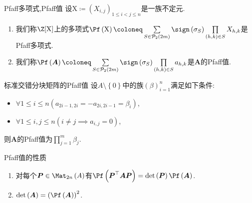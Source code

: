 \begin{definition}{Pfaff多项式,Pfaff值}{}
	设$\mathrm{X}\coloneq\left(X_{i,j}\right)_{1\leq i<j\leq n}$是一族不定元.
	\begin{enumerate}
		\item 我们称$\Z[\mathrm{X}]$上的多项式$\Pf\left(\mathrm{X}\right)\coloneq\sum\limits_{S\in\mathcal{P}_{2}\left(2m\right)}\sign\left(\sigma_{S}\right)\prod\limits_{\left(h,k\right)\in S}X_{h,k}$是Pfaff多项式.
		\item 我们称$\Pf\left(\boldsymbol{A}\right)\coloneq\sum\limits_{S\in\mathcal{P}_{2}\left(2m\right)}\sign\left(\sigma_{S}\right)\prod\limits_{\left(h,k\right)\in S}a_{h,k}$是$\boldsymbol{A}$的Pfaff值.
	\end{enumerate}
\end{definition}

\begin{example}{标准交错分块矩阵的Pfaff值}{}
	设$A\setminus\left\{0\right\}$中的族$\left(\beta\right)_{i=1}^{n}$满足如下条件:
	\begin{itemize}
		\item $\forall 1\leq i\leq n\left(a_{2i-1,2i}=-a_{2i,2i-1}=\beta_{i}\right)$,
		\item $\forall 1\leq i,j\leq n\left(i\neq j\implies a_{i,j}=0\right)$,
	\end{itemize}
	则$\boldsymbol{A}$的Pfaff值为$\prod\limits_{j=1}^{m}\beta_{j}$.
\end{example}

\begin{proposition}{Pfaff值的性质}{}
	\begin{enumerate}
		\item 对每个$\boldsymbol{P}\in\Mat_{2n}\left(A\right)$有$\Pf\left(\boldsymbol{P}^{\top}\boldsymbol{A}\boldsymbol{P}\right)=\det\left(\boldsymbol{P}\right)\Pf\left(\boldsymbol{A}\right)$.
		\item $\det\left(\boldsymbol{A}\right)=\left(\Pf\left(\boldsymbol{A}\right)\right)^{2}$.
	\end{enumerate}
\end{proposition}

